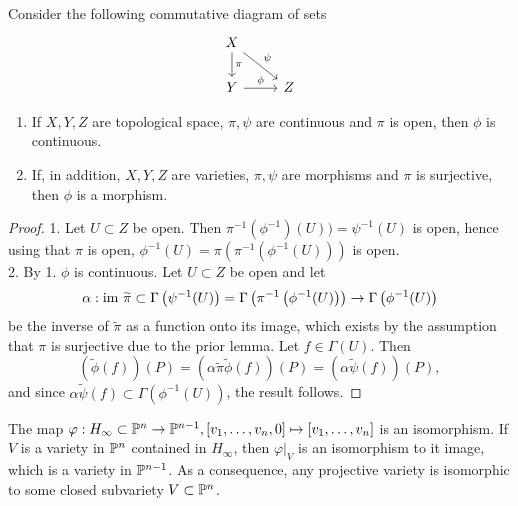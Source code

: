     \begin{lemma}\label{DescentingMorphismToMorphismViaOpenSurjectiveMorphism}
        Consider the following commutative diagram of sets
        $$
            \begin{tikzcd}
                X \arrow[d, "\pi"] \arrow[rd, "\psi"] \\
                Y \arrow[r, "\phi"] & Z
            \end{tikzcd}
        $$
        \begin{enumerate}
            \item If $X,Y,Z$ are topological space, $\pi,\psi$ are continuous and $\pi$ is open, then $\phi$ is continuous.
            \item If, in addition, $X,Y,Z$ are varieties, $\pi,\psi$ are morphisms and $\pi$ is surjective, then $\phi$ is a morphism. 
        \end{enumerate}
    \end{lemma}
    \begin{proof}
        1. Let $U\subset Z$ be open. Then $\pi^{-1}(\phi^{-1})(U))=\psi^{-1}(U)$ is open, hence using that $\pi$ is open, $\phi^{-1}(U)= \pi(\pi^{-1}(\phi^{-1}(U)))$ is open.\\
        2. By 1. $\phi$ is continuous. Let $U\subset Z$ be open and let 
        $$\alpha: \im\ \widetilde{\pi}\subset \Gamma\left(\psi^{-1}(U)\right)=\Gamma\left(\pi^{-1}\left(\phi^{-1}(U)\right)\right)\rightarrow \Gamma\left(\phi^{-1}(U)\right)$$
        be the inverse of $\widetilde{\pi}$ as a function onto its image, which exists by the assumption that $\pi$ is surjective due to the prior lemma. Let $f\in \Gamma(U)$. Then 
        $$(\widetilde{\phi}(f))(P) = (\alpha\widetilde{\pi}\widetilde{\phi}(f))(P)= (\alpha\widetilde{\psi}(f))(P),$$
        and since $\alpha\widetilde{\psi}(f)\subset \Gamma\left(\phi^{-1}(U)\right)$, the result follows. 
    \end{proof}
    \begin{lemma}
        The map $\varphi: H_\infty \subset \mathbb{P}^n \rightarrow \mathbb{P}^{n-1}, [v_1,\dots,v_n,0]\mapsto [v_1,\dots,v_n]$ is an isomorphism. If $V$ is a variety in $\mathbb{P}^n$ contained in $H_\infty$, then $\left.\varphi\right|_{V}$ is an isomorphism to it image, which is a variety in $\mathbb{P}^{n-1}$. As a consequence, any projective variety is isomorphic to some closed subvariety $V\subset \mathbb{P}^n$. 
    \end{lemma}
